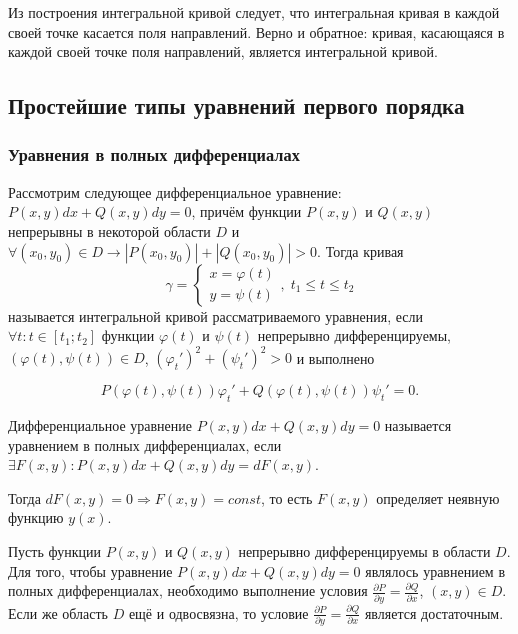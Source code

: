 Из построения интегральной кривой следует, что интегральная кривая в каждой своей точке касается поля направлений. Верно и обратное: кривая, касающаяся в каждой своей точке поля направлений, является интегральной кривой.

\subsection{Простейшие типы уравнений первого порядка}
\subsubsection{Уравнения в полных дифференциалах}

Рассмотрим следующее дифференциальное уравнение: $P(x, y)dx + Q(x, y)dy = 0$, причём функции $P(x, y)$ и $Q(x, y)$ непрерывны в некоторой области $D$ и $\forall (x_0, y_0) \in D \rightarrow |P(x_0, y_0)| + |Q(x_0, y_0)| > 0$. Тогда кривая 
\begin{equation}
    \gamma = 
    \begin{cases}
        x = \varphi(t) \\ 
        y = \psi(t)
    \end{cases}, \; t_1 \leqslant t \leqslant t_2
\end{equation}
называется интегральной кривой рассматриваемого уравнения, если $\forall t: t \in [t_1; t_2]$ функции $\varphi(t)$ и $\psi(t)$ непрерывно дифференцируемы, $(\varphi(t), \psi(t)) \in D$, $(\varphi_t')^2 + (\psi_t')^2 > 0$ и выполнено

\begin{equation}
    P(\varphi(t), \psi(t)) \varphi_t' + Q(\varphi(t), \psi(t)) \psi_t' = 0.
\end{equation}

\begin{definition}
    Дифференциальное уравнение $P(x, y)dx + Q(x, y)dy = 0$ называется уравнением в полных дифференциалах, если $\exists F(x, y): P(x, y)dx + Q(x, y)dy = dF(x, y)$. 
\end{definition}

Тогда $dF(x, y) = 0 \Rightarrow F(x, y) = const$, то есть $F(x, y)$ определяет неявную функцию $y(x)$.

\begin{theorem}
    Пусть функции $P(x, y)$ и $Q(x, y)$ непрерывно дифференцируемы в области $D$. Для того, чтобы уравнение $P(x, y)dx + Q(x, y)dy = 0$ являлось уравнением в полных дифференциалах, необходимо выполнение условия $\frac{\partial P}{\partial y} = \frac{\partial Q}{\partial x}$, $(x, y) \in D$. Если же область $D$ ещё и одвосвязна, то условие $\frac{\partial P}{\partial y} = \frac{\partial Q}{\partial x}$ является достаточным.
\end{theorem}

